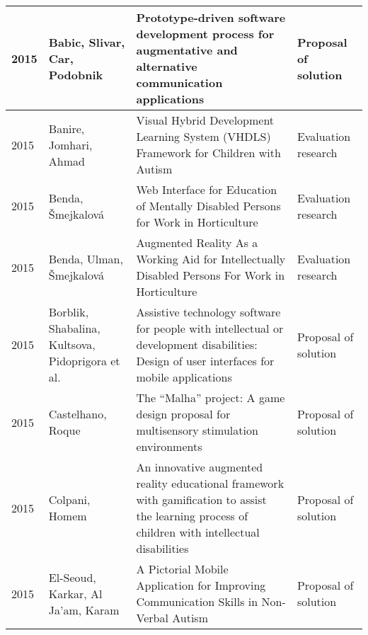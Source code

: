 \documentclass[utf8,english]{gradu3}
\begin{document}
\begin{longtable}{|>{\scriptsize}l|>{\scriptsize}p{3cm}|>{\scriptsize}p{8cm}|>{\scriptsize}p{2.4cm}|}
  2015          & Babic, Slivar, Car, Podobnik                                         & Prototype-driven software development process for augmentative and alternative communication applications                                                                                    & Proposal of solution       \\ \hline
  2015          & Banire, Jomhari, Ahmad                                               & Visual Hybrid Development Learning System (VHDLS) Framework for Children with Autism                                                                                                         & Evaluation research        \\ \hline
  2015          & Benda, Šmejkalová                                                    & Web Interface for Education of Mentally Disabled Persons for Work in Horticulture                                                                                                            & Evaluation research        \\ \hline
  2015          & Benda, Ulman, Šmejkalová                                             & Augmented Reality As a Working Aid for Intellectually Disabled Persons For Work in Horticulture                                                                                              & Evaluation research        \\ \hline
  2015          & Borblik, Shabalina, Kultsova, Pidoprigora et al.                     & Assistive technology software for people with intellectual or development disabilities: Design of user interfaces for mobile applications                                                    & Proposal of solution       \\ \hline
  2015          & Castelhano, Roque                                                    & The “Malha” project: A game design proposal for multisensory stimulation environments                                                                                                        & Proposal of solution       \\ \hline
  2015          & Colpani, Homem                                                       & An innovative augmented reality educational framework with gamification to assist the learning process of children with intellectual disabilities                                            & Proposal of solution       \\ \hline
  2015          & El-Seoud, Karkar, Al Ja'am, Karam                                    & A Pictorial Mobile Application for Improving Communication Skills in Non-Verbal Autism                                                                                                       & Proposal of solution       \\ \hline

\end{longtable}
\end{document}
